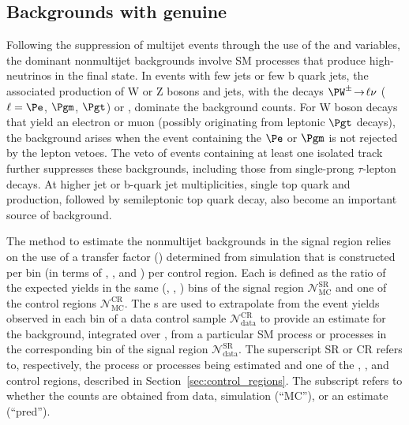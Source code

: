 \subsection{Backgrounds with genuine \texorpdfstring{\ETmiss}{MET}}
\label{sec:ewk_background}

Following the suppression of multijet events through the use of the
\alphat and \bdphi variables, the dominant nonmultijet backgrounds
involve SM processes that produce high-\Pt neutrinos in the final
state. In events with few jets or few b quark jets, the associated
production of W or Z bosons and jets, with the decays $\PW^\pm
\!\rightarrow\! \ell\nu$ ($\ell=\Pe$, $\Pgm$, $\Pgt$) or \znunu,
dominate the background counts. For W boson decays that yield an
electron or muon (possibly originating from leptonic $\Pgt$ decays),
the background arises when the event containing the $\Pe$ or $\Pgm$ is
not rejected by the lepton vetoes.
The veto of events containing at least one isolated track further
suppresses these backgrounds, including those from single-prong
$\tau$-lepton decays. At higher jet or b-quark jet multiplicities,
single top quark and \ttbar production, followed by semileptonic top
quark decay, also become an important source of background.

The method to estimate the nonmultijet backgrounds in the signal
region relies on the use of a transfer factor (\tf) determined from
simulation that is constructed per bin (in terms of \njet, \nb, and
\scalht) per control region. Each \tf is defined as the ratio of the
expected yields in the same (\njet, \nb, \scalht) bins of the signal
region $\mathcal{N}^\text{SR}_\text{MC}$ and one of the control
regions $\mathcal{N}^\text{CR}_\text{MC}$.  The {\tf}s are used to
extrapolate from the event yields observed in each bin of a data
control sample $\mathcal{N}^\text{CR}_\text{data}$ to provide an
estimate for the background, integrated over \HTmiss, from a
particular SM process or processes in the corresponding bin of the
signal region $\mathcal{N}^\text{SR}_\text{data}$.  The superscript SR
or CR refers to, respectively, the process or processes being
estimated and one of the \mj, \mmj, and \gj control regions, described
in Section~\ref{sec:control_regions}. The subscript refers to whether
the counts are obtained from data, simulation (``MC''), or an estimate
(``pred'').


